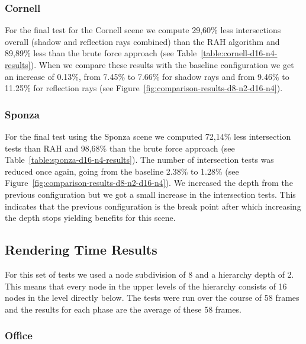 \subsubsection{Cornell}

For the final test for the Cornell scene we compute 29,60\% less intersections overall (shadow and reflection rays combined) than the RAH algorithm and 89,89\% less than the brute force approach (see Table~\ref{table:cornell-d16-n4-results}). When we compare these results with the baseline configuration we get an increase of 0.13\%, from 7.45\% to 7.66\% for shadow rays and from 9.46\% to 11.25\% for reflection rays (see Figure~\ref{fig:comparison-results-d8-n2-d16-n4}).

\subsubsection{Sponza}

For the final test using the Sponza scene we computed 72,14\% less intersection tests than RAH and 98,68\% than the brute force approach (see Table~\ref{table:sponza-d16-n4-results}). The number of intersection tests was reduced once again, going from the baseline 2.38\% to 1.28\% (see Figure~\ref{fig:comparison-results-d8-n2-d16-n4}). We increased the depth from the previous configuration but we got a small increase in the intersection tests. This indicates that the previous configuration is the break point after which increasing the depth stops yielding benefits for this scene.


\subsection{Rendering Time Results}

For this set of tests we used a node subdivision of 8 and a hierarchy depth of 2. This means that every node in the upper levels of the hierarchy consists of 16 nodes in the level directly below. The tests were run over the course of 58 frames and the results for each phase are the average of these 58 frames. 

\subsubsection{Office}

